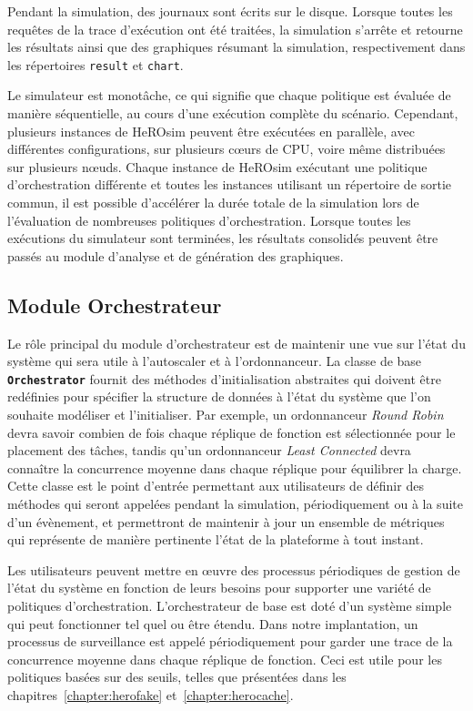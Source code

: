 Pendant la simulation, des journaux sont écrits sur le disque. Lorsque toutes les requêtes de la trace d'exécution ont été traitées, la simulation s'arrête et retourne les résultats ainsi que des graphiques résumant la simulation, respectivement dans les répertoires \texttt{result} et \texttt{chart}.

Le simulateur est monotâche, ce qui signifie que chaque politique est évaluée de manière séquentielle, au cours d'une exécution complète du scénario. Cependant, plusieurs instances de HeROsim peuvent être exécutées en parallèle, avec différentes configurations, sur plusieurs cœurs de \gls{CPU}, voire même distribuées sur plusieurs nœuds. Chaque instance de HeROsim exécutant une politique d'orchestration différente et toutes les instances utilisant un répertoire de sortie commun, il est possible d'accélérer la durée totale de la simulation lors de l'évaluation de nombreuses politiques d'orchestration. Lorsque toutes les exécutions du simulateur sont terminées, les résultats consolidés peuvent être passés au module d'analyse et de génération des graphiques.

\subsection{Module Orchestrateur}

Le rôle principal du module d'orchestrateur est de maintenir une vue sur l'état du système qui sera utile à l'autoscaler et à l'ordonnanceur. La classe de base \textbf{\texttt{Orchestrator}} fournit des méthodes d'initialisation abstraites qui doivent être redéfinies pour spécifier la structure de données à l'état du système que l'on souhaite modéliser et l'initialiser. Par exemple, un ordonnanceur \textit{Round Robin} devra savoir combien de fois chaque réplique de fonction est sélectionnée pour le placement des tâches, tandis qu'un ordonnanceur \textit{Least Connected} devra connaître la concurrence moyenne dans chaque réplique pour équilibrer la charge. Cette classe est le point d'entrée permettant aux utilisateurs de définir des méthodes qui seront appelées pendant la simulation, périodiquement ou à la suite d'un évènement, et permettront de maintenir à jour un ensemble de métriques qui représente de manière pertinente l'état de la plateforme à tout instant.

Les utilisateurs peuvent mettre en œuvre des processus périodiques de gestion de l'état du système en fonction de leurs besoins pour supporter une variété de politiques d'orchestration. L'orchestrateur de base est doté d'un système simple qui peut fonctionner tel quel ou être étendu. Dans notre implantation, un processus de surveillance est appelé périodiquement pour garder une trace de la concurrence moyenne dans chaque réplique de fonction. Ceci est utile pour les politiques basées sur des seuils, telles que présentées dans les chapitres~\ref{chapter:herofake} et~\ref{chapter:herocache}.

